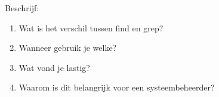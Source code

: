 Beschrijf:
\begin{enumerate}
\item Wat is het verschil tussen find en grep?
\item Wanneer gebruik je welke?
\item Wat vond je lastig?
\item Waarom is dit belangrijk voor een systeembeheerder?
\end{enumerate}

